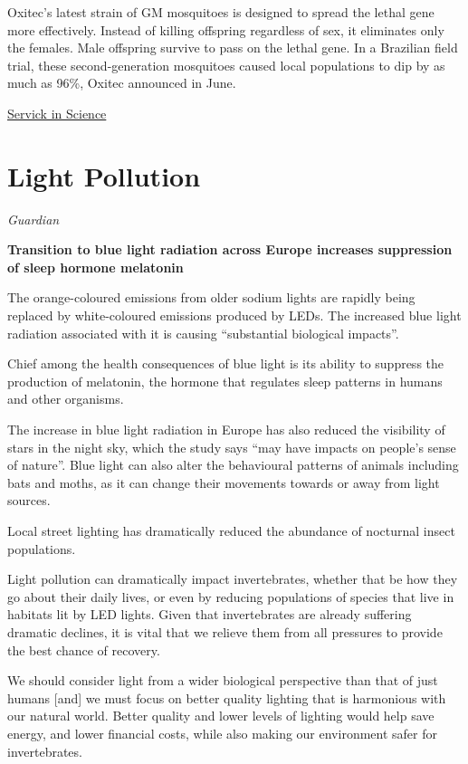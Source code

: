 \documentclass[
]{book}
\begin{document}
Oxitec's latest strain of GM mosquitoes is designed to spread the lethal gene more effectively. Instead of killing offspring regardless of sex, it eliminates only the females. Male offspring survive to pass on the lethal gene. In a Brazilian field trial, these second-generation mosquitoes caused local populations to dip by as much as 96\%, Oxitec announced in June.

\href{https://www.sciencemag.org/news/2019/09/study-dna-spread-genetically-modified-mosquitoes-prompts-backlash}{Servick in Science}

\hypertarget{light-pollution}{%
\section{Light Pollution}\label{light-pollution}}

\emph{Guardian}

\textbf{Transition to blue light radiation across Europe increases suppression of sleep hormone melatonin}

The orange-coloured emissions from older sodium lights are rapidly being replaced by white-coloured emissions produced by LEDs.
The increased blue light radiation associated with it is causing ``substantial biological impacts''.

Chief among the health consequences of blue light is its ability to suppress the production of melatonin, the hormone that regulates sleep patterns in humans and other organisms.

The increase in blue light radiation in Europe has also reduced the visibility of stars in the night sky, which the study says ``may have impacts on people's sense of nature''. Blue light can also alter the behavioural patterns of animals including bats and moths, as it can change their movements towards or away from light sources.

Local street lighting has dramatically reduced the abundance of nocturnal insect populations.

Light pollution can dramatically impact invertebrates, whether that be how they go about their daily lives, or even by reducing populations of species that live in habitats lit by LED lights. Given that invertebrates are already suffering dramatic declines, it is vital that we relieve them from all pressures to provide the best chance of recovery.

We should consider light from a wider biological perspective than that of just humans {[}and{]} we must focus on better quality lighting that is harmonious with our natural world. Better quality and lower levels of lighting would help save energy, and lower financial costs, while also making our environment safer for invertebrates.
\end{document}
